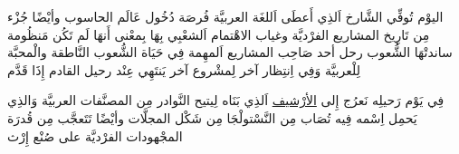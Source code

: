 \documentclass{article}
\begin{document}
\begin{Arabic}

 اليوْم تُوفِّي الشَّارخ اَلذِي أَعطَى اَللغَة العربيَّة فُرصَة دُخُول عَالَم الحاسوب وأيْضًا جُزْء مِن تَارِيخ المشاريع الفرْديَّة وغياب الاهْتمام اَلشعْبِي بِهَا بِمعْنى أَنهَا لَم تَكُن مَنظُومة ساندتْهَا الشُّعوب رحل أحد صَاحِب المشاريع اَلمهِمة فِي حَيَاة الشُّعوب النَّاطقة والْمحبَّة لِلْعربيَّة وَفِي اِنتِظار آخر لِمشْروع آخر يَنتَهِي عِنْد رحيل القادم إِذَا قَدَّم
 
 فِي يَوْم رَحيلِه نَعرُج إِلى \href{https://archive.alsharekh.org/}{الأرْشيف} اَلذِي بَنَاه لِيتيح النَّوادر مِن المصنَّفات العربيَّة وَالذِي يَحمِل اِسْمه فِيه تُصَاب مِن النَّسْتولْجَا مِن شَكْل المجلَّات وأيْضًا تَتَعجَّب مِن قُدرَة المجْهودات الفرْديَّة على صُنْع إِرْث 

\end{Arabic}
\end{document}
